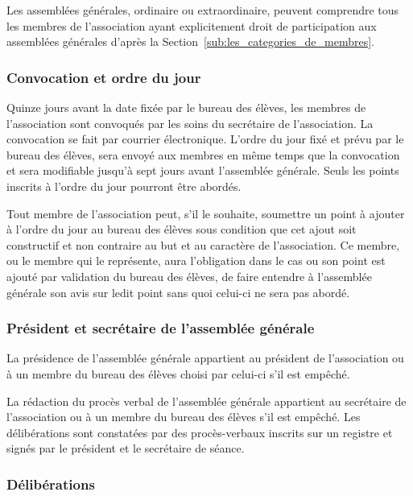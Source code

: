 \documentclass{article}
\begin{document}
				Les assemblées générales, ordinaire ou extraordinaire, peuvent
				comprendre tous les membres de l’association ayant explicitement
				droit de participation aux assemblées générales d'après la
				Section~\ref{sub:les_categories_de_membres}.

			\subsubsection{Convocation et ordre du jour}
\label{ssub:convocation_et_ordre_du_jour}
				Quinze jours avant la date fixée par le bureau des élèves, les
				membres de l’association sont convoqués par les soins du
				secrétaire de l’association. La convocation se fait par courrier
				électronique. L’ordre du jour fixé et prévu par le bureau des
				élèves, sera envoyé aux membres en même temps que la convocation
				et sera modifiable jusqu’à sept jours avant l'assemblée
				générale. Seuls les points inscrits à l’ordre du jour pourront
				être abordés.
				
				Tout membre de l'association peut, s'il le souhaite, soumettre
				un point à ajouter à l'ordre du jour au bureau des élèves sous
				condition que cet ajout soit constructif et non contraire au but
				et au caractère de l'association. Ce membre, ou le membre qui le
				représente, aura l'obligation dans le cas ou son point est
				ajouté par validation du bureau des élèves, de faire entendre à
				l'assemblée générale son avis sur ledit point sans quoi celui-ci
				ne sera pas abordé.

			\subsubsection{Président et secrétaire de l'assemblée générale}
\label{ssub:president_et_secretaire_de_l_assemblee_generale}
			
				La présidence de l’assemblée générale appartient au président de
				l’association ou à un membre du bureau des élèves choisi par
				celui-ci s'il est empêché.

				La rédaction du procès verbal de l’assemblée générale appartient
				au secrétaire de l’association ou à un membre du bureau des
				élèves s’il est empêché. Les délibérations sont constatées par
				des procès-verbaux inscrits sur un registre et signés par le
				président et le secrétaire de séance.

			\subsubsection{Délibérations}
\label{ssub:deliberations}
			
\end{document}
